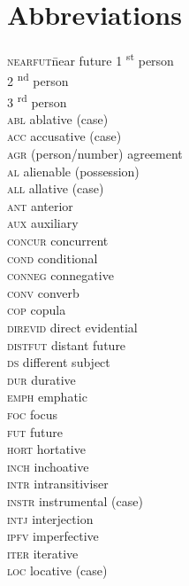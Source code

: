 \documentclass[output=paper,colorlinks,citecolor=brown]{langscibook}
\begin{document}
\section*{Abbreviations}
\begin{multicols}{2}
\begin{tabbing}
\textsc{nearfut}\hspace{1ex}\=near future\kill
\textsc{1} \textsuperscript{st} person\\
\textsc{2} \textsuperscript{nd} person\\
\textsc{3} \textsuperscript{rd} person\\
\textsc{abl} \> ablative (case)\\
\textsc{acc} \> accusative (case)\\
\textsc{agr} \> (person/number) agreement\\
\textsc{al} \> alienable (possession)\\
\textsc{all} \> allative (case)\\
\textsc{ant} \> anterior\\
\textsc{aux} \> auxiliary\\
\textsc{concur} \> concurrent\\
\textsc{cond} \> conditional\\
\textsc{conneg} \> connegative\\
\textsc{conv} \> converb\\
\textsc{cop} \> copula\\
\textsc{direvid} \> direct evidential\\
\textsc{distfut} \> distant future\\
\textsc{ds} \> different subject\\
\textsc{dur} \> durative\\
\textsc{emph} \> emphatic\\
\textsc{foc} \> focus\\
\textsc{fut} \> future\\
\textsc{hort} \> hortative\\
\textsc{inch} \> inchoative\\
\textsc{intr} \> intransitiviser\\
\textsc{instr} \> instrumental (case)\\
\textsc{intj} \> interjection\\
\textsc{ipfv} \> imperfective\\
\textsc{iter} \> iterative\\
\textsc{loc} \> locative (case)\\

\end{tabbing}
\end{multicols}
\end{document}
